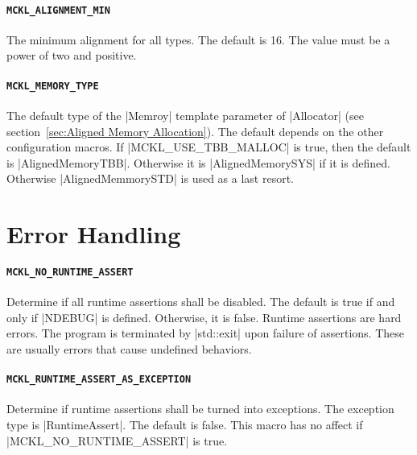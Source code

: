\paragraph{\texttt{MCKL\_ALIGNMENT\_MIN}} The minimum alignment for all types.
The default is 16. The value must be a power of two and positive.

\paragraph{\texttt{MCKL\_MEMORY\_TYPE}} The default type of the |Memroy|
template parameter of |Allocator| (see section~\ref{sec:Aligned Memory
  Allocation}). The default depends on the other configuration macros. If
|MCKL_USE_TBB_MALLOC| is true, then the default is |AlignedMemoryTBB|.
Otherwise it is |AlignedMemorySYS| if it is defined. Otherwise
|AlignedMemmorySTD| is used as a last resort.

\section{Error Handling}
\label{sec:Error Handling}

\paragraph{\texttt{MCKL\_NO\_RUNTIME\_ASSERT}} Determine if all runtime
assertions shall be disabled. The default is true if and only if |NDEBUG| is
defined. Otherwise, it is false. Runtime assertions are hard errors. The
program is terminated by |std::exit| upon failure of assertions. These are
usually errors that cause undefined behaviors.

\paragraph{\texttt{MCKL\_RUNTIME\_ASSERT\_AS\_EXCEPTION}} Determine if runtime
assertions shall be turned into exceptions. The exception type is
|RuntimeAssert|. The default is false. This macro has no affect if
|MCKL_NO_RUNTIME_ASSERT| is true.
